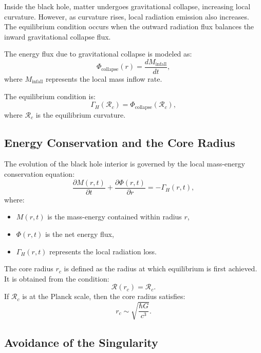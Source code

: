 Inside the black hole, matter undergoes gravitational collapse, increasing local curvature. However, as curvature rises, local radiation emission also increases. The equilibrium condition occurs when the outward radiation flux balances the inward gravitational collapse flux.

The energy flux due to gravitational collapse is modeled as:
\begin{equation}
    \Phi_{\text{collapse}}(r) = \frac{dM_{\text{infall}}}{dt},
\end{equation}
where \( M_{\text{infall}} \) represents the local mass inflow rate.

The equilibrium condition is:
\begin{equation}
    \Gamma_H(\mathcal{R}_c) = \Phi_{\text{collapse}}(\mathcal{R}_c),
\end{equation}
where \( \mathcal{R}_c \) is the equilibrium curvature.

\subsection{Energy Conservation and the Core Radius}

The evolution of the black hole interior is governed by the local mass-energy conservation equation:
\begin{equation}
    \frac{\partial M(r, t)}{\partial t} + \frac{\partial \Phi(r,t)}{\partial r} = -\Gamma_H(r, t),
\end{equation}
where:
\begin{itemize}
    \item \( M(r,t) \) is the mass-energy contained within radius \( r \),
    \item \( \Phi(r,t) \) is the net energy flux,
    \item \( \Gamma_H(r,t) \) represents the local radiation loss.
\end{itemize}

The core radius \( r_c \) is defined as the radius at which equilibrium is first achieved. It is obtained from the condition:
\begin{equation}
    \mathcal{R}(r_c) = \mathcal{R}_c.
\end{equation}
If \( \mathcal{R}_c \) is at the Planck scale, then the core radius satisfies:
\begin{equation}
    r_c \sim \sqrt{\frac{\hbar G}{c^3}}.
\end{equation}

\subsection{Avoidance of the Singularity}

